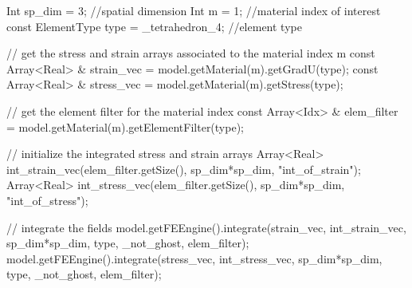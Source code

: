 \begin{cpp}
Int sp_dim = 3; //spatial dimension
Int m = 1; //material index of interest
const ElementType type = _tetrahedron_4; //element type

// get the stress and strain arrays associated to the material index m
const Array<Real> & strain_vec = model.getMaterial(m).getGradU(type);
const Array<Real> & stress_vec = model.getMaterial(m).getStress(type);

// get the element filter for the material index
const Array<Idx> & elem_filter = model.getMaterial(m).getElementFilter(type);

// initialize the integrated stress and strain arrays
Array<Real> int_strain_vec(elem_filter.getSize(), 
                           sp_dim*sp_dim, "int_of_strain");
Array<Real> int_stress_vec(elem_filter.getSize(), 
                           sp_dim*sp_dim, "int_of_stress");

// integrate the fields      
model.getFEEngine().integrate(strain_vec, int_strain_vec, 
                              sp_dim*sp_dim, type, _not_ghost, elem_filter);
model.getFEEngine().integrate(stress_vec, int_stress_vec, 
                              sp_dim*sp_dim, type, _not_ghost, elem_filter);
\end{cpp}


